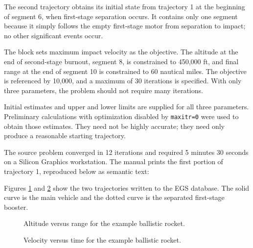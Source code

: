 
The second trajectory obtains its initial state from trajectory 1 at the beginning of
segment 6, when first-stage separation occurs.  It contains only one segment because
it simply follows the empty first-stage motor from separation to impact; no other
significant events occur.


The  block sets maximum impact velocity as the objective.
The altitude at the end of second-stage burnout, segment 8, is constrained to
450,000 ft, and final range at the end of segment 10 is constrained to 60 nautical
miles.  The objective is referenced by 10,000, and a maximum of 30 iterations is
specified.  With only three parameters, the problem should not require many
iterations.

Initial estimates and upper and lower limits are supplied for all three parameters.
Preliminary calculations with optimization disabled by \texttt{maxitr=0} were used
to obtain those estimates.  They need not be highly accurate; they need only produce
a reasonable starting trajectory.


The source problem converged in 12 iterations and required 5 minutes 30 seconds on
a Silicon Graphics workstation.  The manual prints the first portion of trajectory 1,
reproduced below as semantic text:

\begin{center}
\begin{minipage}{0.98\linewidth}

\end{minipage}
\end{center}

Figures \ref{fig:example-rocket-altitude-range} and
\ref{fig:example-rocket-velocity-time} show the two trajectories written to the EGS
database.  The solid curve is the main vehicle and the dotted curve is the separated
first-stage booster.

\begin{figure}[htbp]
  \centering
  \resizebox{0.84\linewidth}{!}{}
  \caption{Altitude versus range for the example ballistic rocket.}
  \label{fig:example-rocket-altitude-range}
\end{figure}

\begin{figure}[htbp]
  \centering
  \resizebox{0.84\linewidth}{!}{}
  \caption{Velocity versus time for the example ballistic rocket.}
  \label{fig:example-rocket-velocity-time}
\end{figure}
